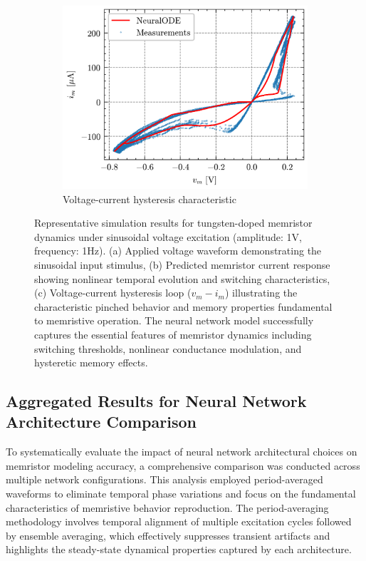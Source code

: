 \documentclass[11pt, oneside]{article}
\begin{document}
\begin{figure}[H]
\begin{subfigure}[b]{\subwidth}
        \includegraphics[width=\linewidth]{sample_results/hysteresis.png}
        \caption{Voltage-current hysteresis characteristic}
    \end{subfigure}
    \caption{Representative simulation results for tungsten-doped memristor dynamics under sinusoidal voltage excitation (amplitude: 1V, frequency: 1Hz). (a) Applied voltage waveform demonstrating the sinusoidal input stimulus, (b) Predicted memristor current response showing nonlinear temporal evolution and switching characteristics, (c) Voltage-current hysteresis loop ($v_m - i_m$) illustrating the characteristic pinched behavior and memory properties fundamental to memristive operation. The neural network model successfully captures the essential features of memristor dynamics including switching thresholds, nonlinear conductance modulation, and hysteretic memory effects.}
    \label{fig:sample-results}
\end{figure}


\subsection{Aggregated Results for Neural Network Architecture Comparison}

To systematically evaluate the impact of neural network architectural choices on memristor modeling accuracy, a comprehensive comparison was conducted across multiple network configurations. This analysis employed period-averaged waveforms to eliminate temporal phase variations and focus on the fundamental characteristics of memristive behavior reproduction. The period-averaging methodology involves temporal alignment of multiple excitation cycles followed by ensemble averaging, which effectively suppresses transient artifacts and highlights the steady-state dynamical properties captured by each architecture.
\end{document}
